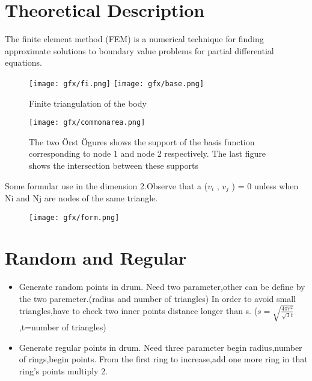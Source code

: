 \documentclass[a4,10pt]{article}
\begin{document}
  \section{Theoretical Description }

    The finite element method (FEM) is a numerical technique for finding approximate solutions to boundary value problems for partial differential equations.
    \begin{figure}[H]
      \centering
      \texttt{[image: gfx/fi.png]}
      \texttt{[image: gfx/base.png]}

      \caption{Finite triangulation of the body\cite{IEEEhowto:kopka}}
      \label{fig:fi}
    \end{figure}

    \begin{figure}[H]
      \centering
      \texttt{[image: gfx/commonarea.png]}
      \caption{The two Örst Ögures shows the support of the basis function corresponding
to node 1 and node 2 respectively. The last figure shows the intersection
between these supports\cite{IEEEhowto:kopka}}
      \label{fig:fi}
    \end{figure}
Some formular use in the dimension 2.Observe that a ($v_{i}$
, $v_{j}$ ) = 0 unless when Ni and Nj are nodes of the same triangle.

    \begin{figure}[H]
      \texttt{[image: gfx/form.png]}
      \label{fig:fi}
    \end{figure}

  \section{Random and Regular}
\vspace{10pt}
  \begin{itemize}
    \item Generate random points in drum.
Need two parameter,other can be define by the two paremeter.(radius and number of triangles)
In order to avoid small triangles,have to check two inner points distance longer than s.
($s=\sqrt{\frac{4\pi {r}^{2}}{\sqrt{3}t}}$,t=number of triangles)
\vspace{10pt}

    \item Generate regular points in drum.
Need three parameter begin radius,number of rings,begin points.
From the first ring to increase,add one more ring in that ring's points multiply 2.
  \end{itemize}
\end{document}
